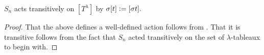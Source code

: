 \begin{cor}
	$S_n$ acts transitively on $[T^\lambda]$ by $\sigma [t] \vcentcolon= [\sigma t].$
\end{cor}
\begin{proof} 
	That the above defines a well-defined action follows from . That it is transitive follows from the fact that $S_n$ acted transitively on the set of $\lambda$-tableaux to begin with.
\end{proof}




